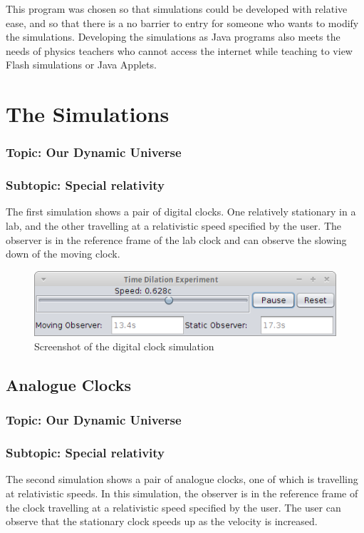\documentclass[11pt]{article}
\begin{document}
This program was chosen so that simulations could be developed with
relative ease, and so that there is a no barrier to entry for someone
who wants to modify the simulations. Developing the simulations as
Java programs also meets the needs of physics teachers who cannot
access the internet while teaching to view Flash simulations or Java Applets.

\section*{The Simulations}
\subsubsection*{Topic: Our Dynamic Universe}
\subsubsection*{Subtopic: Special relativity}
The first simulation shows a pair of digital clocks. One relatively stationary in a lab, and the other travelling at a relativistic speed specified by the user. The observer is in the reference frame of the lab clock and can observe the slowing down of the moving clock.

\begin{figure}[H]
\centering
\includegraphics[width=.9\linewidth]{./digitalUI.png}
\caption{Screenshot of the digital clock simulation}
\end{figure}

\subsection*{Analogue Clocks}
\subsubsection*{Topic: Our Dynamic Universe}
\subsubsection*{Subtopic: Special relativity}
The second simulation shows a pair of analogue clocks, one of which is
travelling at relativistic speeds. In this simulation, the observer is in the reference frame of the clock travelling at a relativistic speed specified by the user. The user can observe that the stationary clock speeds up as the velocity is increased.
\end{document}
